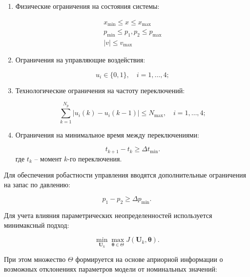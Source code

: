 \begin{enumerate}
\item Физические ограничения на состояния системы:
	

\begin{equation}
\begin{aligned}
x_{\min} \leq x \leq x_{\max} \\
p_{\min} \leq p_1, p_2 \leq p_{\max} \\
|v| \leq v_{\max}
\end{aligned}
\end{equation}

\item Ограничения на управляющие воздействия:

\begin{equation}
u_i \in \{0,1\}, \quad i = 1,\ldots,4;
\end{equation}

\item Технологические ограничения на частоту переключений:

\begin{equation}
\sum_{k=1}^{N_p} |u_i(k) - u_i(k-1)| \leq N_{\max}, \quad i = 1,\ldots,4;
\end{equation}

\item Ограничения на минимальное время между переключениями:

\begin{equation}
t_{k+1} - t_k \geq \Delta t_{\min}.
\end{equation}
где $t_k$ -- момент $k$-го переключения.
\end{enumerate}

Для обеспечения робастности управления вводятся дополнительные ограничения на запас по давлению:

\begin{equation}
p_1 - p_2 \geq \Delta p_{\min}.
\end{equation}

Для учета влияния параметрических неопределенностей используется минимаксный подход:

\begin{equation}
\min_{\mathbf{U}_k} \max_{\boldsymbol{\theta} \in \Theta} J(\mathbf{U}_k, \boldsymbol{\theta}).
\end{equation}

При этом множество $\Theta$ формируется на основе априорной информации о
возможных отклонениях параметров модели от номинальных значений:

